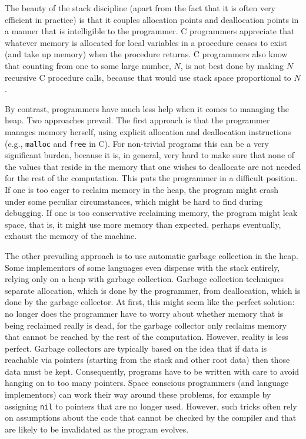 \documentclass[12pt]{book}
\begin{document}
The beauty of the stack discipline (apart from the fact that it is often very
efficient in practice) is that it couples allocation points and deallocation
points in a manner that is intelligible to the programmer. C programmers
appreciate that whatever memory is allocated for local variables in a procedure
ceases to exist (and take up memory) when the procedure returns.
%
%
C programmers also know that counting from one to some large number, $N$, is not
best done by making $N$ recursive C procedure calls, because that would use
stack space proportional to $N$.

By contrast, programmers have much less help when it comes to managing the heap.
Two approaches prevail. The first approach is that the programmer manages memory
herself, using explicit allocation and deallocation instructions (e.g.,
%
%
\lstinline{malloc} and
%
%
\lstinline{free} in C). For non-trivial programs this can be a very significant
burden, because it is, in general, very hard to make sure that none of the
values that reside in the memory that one wishes to deallocate are not needed
for the rest of the computation.  This puts the programmer in a difficult
position. If one is too eager to reclaim memory in the heap, the program might
crash under some peculiar circumstances, which might be hard to find during
debugging.  If one is too conservative reclaiming memory, the program might leak
space, that is, it might use more memory than expected, perhaps eventually,
exhaust the memory of the machine.

The other prevailing approach is to use automatic garbage collection in the
heap.  Some implementors of some languages even dispense with the stack
entirely, relying only on a heap with garbage collection.  Garbage collection
techniques separate allocation, which is done by the programmer, from
deallocation, which is done by the garbage collector.  At first, this might
seem like the perfect solution: no longer does the programmer have to worry
about whether memory that is being reclaimed really is dead, for the garbage
collector only reclaims memory that cannot be reached by the rest of the
computation. However, reality is less perfect. Garbage collectors are typically
based on the idea that if data is reachable via pointers (starting from the
stack and other root data) then those data must be kept. Consequently, programs
have to be written with care to avoid hanging on to too many pointers. Space
conscious programmers (and language implementors) can work their way around
these problems, for example by assigning \lstinline{nil} to pointers that are no
longer used.  However, such tricks often rely on assumptions about the code that
cannot be checked by the compiler and that are likely to be invalidated as the
program evolves.
\end{document}
